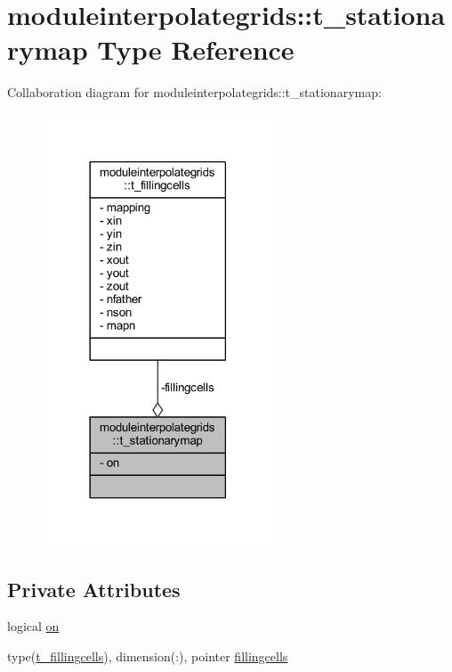 \hypertarget{structmoduleinterpolategrids_1_1t__stationarymap}{}\section{moduleinterpolategrids\+:\+:t\+\_\+stationarymap Type Reference}
\label{structmoduleinterpolategrids_1_1t__stationarymap}


Collaboration diagram for moduleinterpolategrids\+:\+:t\+\_\+stationarymap\+:\nopagebreak
\begin{figure}[H]
\begin{center}
\leavevmode
\includegraphics[width=194pt]{structmoduleinterpolategrids_1_1t__stationarymap__coll__graph}
\end{center}
\end{figure}
\subsection*{Private Attributes}
\begin{DoxyCompactItemize}
\item 
logical \mbox{\hyperlink{structmoduleinterpolategrids_1_1t__stationarymap_a145bee0a647996b98282da4d8e1685de}{on}}
\item 
type(\mbox{\hyperlink{structmoduleinterpolategrids_1_1t__fillingcells}{t\+\_\+fillingcells}}), dimension(\+:), pointer \mbox{\hyperlink{structmoduleinterpolategrids_1_1t__stationarymap_a8e83c24e75b6a4f2068129ad0a51c511}{fillingcells}}
\end{DoxyCompactItemize}


